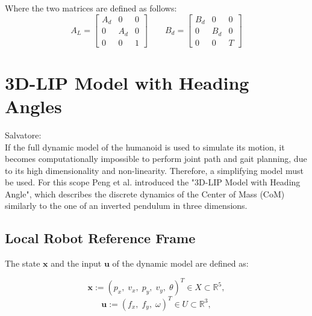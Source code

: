 \documentclass[main.tex]{subfiles}
\begin{document}
Where the two matrices are defined as follows:
\begin{equation}
    A_{L} = 
    \begin{bmatrix}
        A_{d} & 0 & 0 \\
        0 & A_{d} & 0 \\
        0 & 0 & 1
    \end{bmatrix}
    \qquad
    B_{d} = 
    \begin{bmatrix}
        B_{d} & 0 & 0 \\
        0 & B_{d} & 0 \\
        0 & 0 & T
    \end{bmatrix}
\end{equation}




\section{3D-LIP Model with Heading Angles}\label{sec:lip}
Salvatore:\\
If the full dynamic model of the humanoid is used to simulate its motion, it becomes computationally impossible to perform joint path and gait planning, due to its high dimensionality and non-linearity. Therefore, a simplifying model must be used. For this scope Peng et al. introduced the "3D-LIP Model with Heading Angle", which describes the discrete dynamics of the Center of Mass (CoM) similarly to the one of an inverted pendulum in three dimensions.

\subsection{Local Robot Reference Frame}
The state $\mathbf{x}$ and the input $\mathbf{u}$ of the dynamic model are defined as:

$$ \mathbf{x} := \left( p_x,\; v_x,\; p_y,\; v_y,\; \theta \right)^T \in X \subset \mathbb{R}^5 , $$
$$ \mathbf{u} := \left( f_x,\; f_y,\; \omega \right)^T \in U \subset \mathbb{R}^3 , $$
\end{document}

